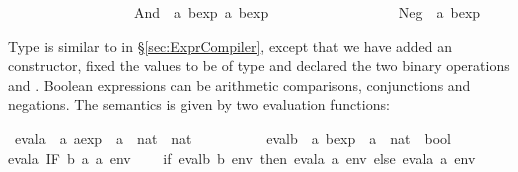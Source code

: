 \begin{isabellebody}
\ \ \ \ \ \ \ \ \ \ \ \ \ \ \ \ \ {}\ And\ \ {}{}a\ bexp{}\ {}{}a\ bexp{}\isanewline
\ \ \ \ \ \ \ \ \ \ \ \ \ \ \ \ \ {}\ Neg\ \ {}{}a\ bexp{}%
\begin{isamarkuptext}%
\noindent
Type  is similar to  in \S\ref{sec:ExprCompiler},
except that we have added an  constructor,
fixed the values to be of type  and declared the two binary
operations  and .  Boolean
expressions can be arithmetic comparisons, conjunctions and negations.
The semantics is given by two evaluation functions:%
\end{isamarkuptext}%
\isamarkuptrue%
\isamarkupfalse%
\ evala\ {}{}\ {}{}a\ aexp\ {}\ {}{}a\ {}\ nat{}\ {}\ nat{}\ \isanewline
\ \ \ \ \ \ \ \ \ evalb\ {}{}\ {}{}a\ bexp\ {}\ {}{}a\ {}\ nat{}\ {}\ bool{}\ \isanewline
{}evala\ {}IF\ b\ a{}\ a{}{}\ env\ {}\isanewline
\ \ \ {}if\ evalb\ b\ env\ then\ evala\ a{}\ env\ else\ evala\ a{}\ env{}{}\ {}\isanewline

\end{isabellebody}
